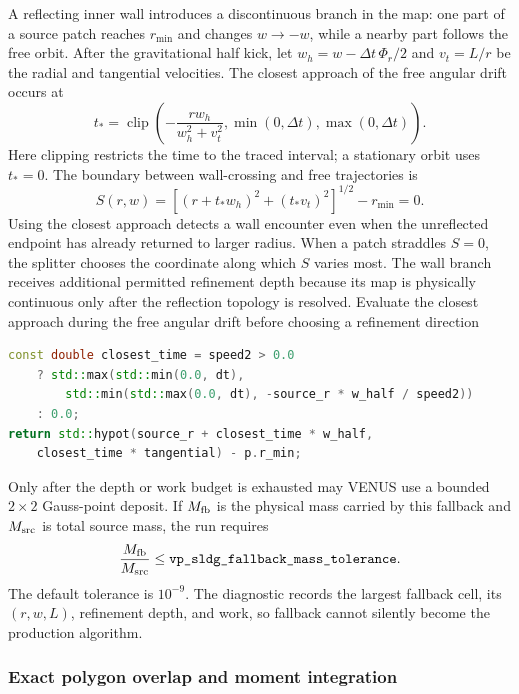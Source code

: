 A reflecting inner wall introduces a discontinuous branch in the map: one
part of a source patch reaches \(r_{\min}\) and changes \(w\to-w\), while a
nearby part follows the free orbit. After the gravitational half kick, let
\(w_h=w-\Delta t\,\Phi_r/2\) and \(v_t=L/r\) be the radial and
tangential velocities. The closest approach of the free angular drift occurs at
\[
 t_* = \operatorname{clip}\!\left(
 -\frac{rw_h}{w_h^2+v_t^2},
 \min(0,\Delta t),\max(0,\Delta t)\right).
\]
Here clipping restricts the time to the traced interval; a stationary orbit
uses \(t_*=0\). The boundary between wall-crossing and free trajectories is
\[
 S(r,w)=\left[(r+t_*w_h)^2+(t_*v_t)^2\right]^{1/2}-r_{\min}=0.
\]
Using the closest approach detects a wall encounter even when the
unreflected endpoint has already returned to larger radius.
When a patch straddles \(S=0\), the splitter chooses the coordinate along
which \(S\) varies most.  The wall branch receives additional permitted
refinement depth because its map is physically continuous only after the
reflection topology is resolved.
{}
{Evaluate the closest approach during the free angular drift before choosing a refinement direction}
\begin{lstlisting}[language=C++]
const double closest_time = speed2 > 0.0
    ? std::max(std::min(0.0, dt),
        std::min(std::max(0.0, dt), -source_r * w_half / speed2))
    : 0.0;
return std::hypot(source_r + closest_time * w_half,
    closest_time * tangential) - p.r_min;
\end{lstlisting}

Only after the depth or work budget is exhausted may VENUS use a bounded
\(2\times2\) Gauss-point deposit.  If \(M_{\rm fb}\) is the physical mass
carried by this fallback and \(M_{\rm src}\) is total source mass, the run
requires
\[
 \frac{M_{\rm fb}}{M_{\rm src}}
 \le\code{vp_sldg_fallback_mass_tolerance}.
\]
The default tolerance is \(10^{-9}\).  The diagnostic records the largest
fallback cell, its \((r,w,L)\), refinement depth, and work, so fallback cannot
silently become the production algorithm.

\subsubsection{Exact polygon overlap and moment integration}

